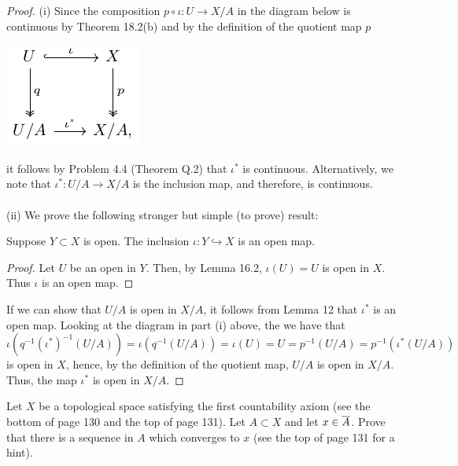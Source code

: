 \begin{proof}
(i) Since the composition $p\circ\iota\colon U\to X/A$ in
the diagram below is continuous by Theorem 18.2(b) and by the
definition of the quotient map $p$
\begin{center}
\includegraphics{figures/hw4-quotient-diagram}
\end{center}
it follows by Problem 4.4 (Theorem Q.2) that $\iota^*$ is
continuous. Alternatively, we note that $\iota^*\colon U/A\to
X/A$ is the inclusion map, and therefore, is continuous.
\\\\
(ii) We prove the following stronger but simple (to prove) result:
\begin{lemma}
Suppose $Y\subset X$ is open. The inclusion $\iota\colon Y\hookrightarrow X$ is
an open map.
\end{lemma}
\begin{proof}
\renewcommand\qedsymbol{$\clubsuit$}
Let $U$ be an open in $Y$. Then, by Lemma 16.2, $\iota(U)=U$ is open in
$X$. Thus $\iota$ is an open map.
\end{proof}
If we can show that $U/A$ is open in $X/A$, it follows from Lemma
12 that $\iota^*$ is an open map. Looking at the diagram in part
(i) above, the we have that
\[
\iota\left(q^{-1}\left(\iota^*\right)^{-1}(U/A)\right)
=\iota(q^{-1}(U/A))
=\iota(U)=
U=p^{-1}(U/A)
=p^{-1}\left(\iota^*(U/A)\right)
\]
is open in $X$, hence, by the definition of the quotient map,
$U/A$ is open in $X/A$. Thus, the map $\iota^*$ is open in
$X/A$.
\end{proof}
\newpage
\begin{problem}[G]
Let $X$ be a topological space satisfying the first countability
axiom (see the bottom of page 130 and the top of page 131). Let
$A\subset X$ and let $x\in\overline{A}$. Prove that there is a
sequence in $A$ which converges to $x$ (see the top of page 131
for a hint).
\end{problem}
